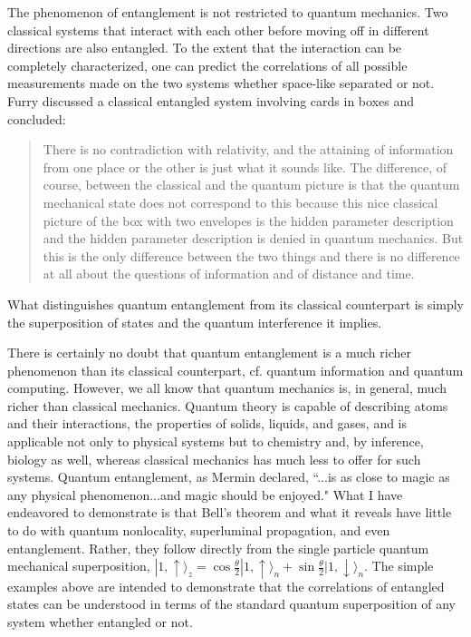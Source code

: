 \documentclass[12pt]{article}
\begin{document}
The phenomenon of entanglement is not restricted to quantum mechanics.  Two classical systems that interact with each other before moving off in different directions are also entangled.  To the extent that the interaction can be completely characterized, one can predict the correlations of all possible measurements made on the two systems whether space-like separated or not. Furry discussed a classical entangled system involving cards in boxes and concluded\cite{Fur62}:
\begin{quote}
There is no contradiction with relativity, and the attaining of information from one place or the other is just what it sounds like. The difference, of course, between the classical and the quantum picture is that the quantum mechanical state does not correspond to this because this nice classical picture of the box with two envelopes is the hidden parameter description and the hidden parameter description is denied in quantum mechanics. But this is the only difference between the two things and there is no difference at all about the questions of information and of distance and time.
\end{quote}
What distinguishes quantum entanglement from its classical counterpart is simply the superposition of states and the quantum interference it implies.

There is certainly no doubt that quantum entanglement is a much richer phenomenon than its classical counterpart, cf. quantum information and quantum computing.  However, we all know that quantum mechanics is, in general, much richer than classical mechanics.  Quantum theory is capable of describing atoms and their interactions, the properties of solids, liquids, and gases, and is applicable not only to physical systems but to chemistry and, by inference, biology as well, whereas classical mechanics has much less to offer for such systems. Quantum entanglement, as Mermin declared\cite{Mer85}, ``...is as close to magic as any physical phenomenon...and magic should be enjoyed."  What I have endeavored to demonstrate is that Bell's theorem and what it reveals have little to do with quantum nonlocality, superluminal propagation, and even entanglement.  Rather, they follow directly from the single particle quantum mechanical superposition, $|1,\uparrow \rangle_z = \cos{\frac{\theta}{2}} |1,\uparrow \rangle_n + \sin{\frac{\theta}{2}} |1,\downarrow \rangle_n$.  The simple examples above are intended to demonstrate that the correlations of entangled states can be understood in terms of the standard quantum superposition of any system whether entangled or not.
\end{document}
